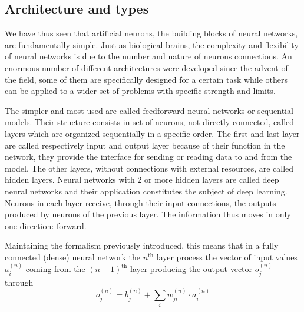 \documentclass[a4paper,10pt]{report}
\begin{document}
\subsection{Architecture and types}

We have thus seen that artificial neurons, the building blocks of neural networks,
are fundamentally simple.
Just as biological brains, the complexity and flexibility
of neural networks is due to the number and nature of neurons connections.
An enormous number of different architectures were developed since the advent of the field,
some of them are specifically designed for a certain task while others can be applied
to a wider set of problems with specific strength and limits.

The simpler and most used are called feedforward neural networks or sequential models.
Their structure consists in set of neurons, not directly connected, called layers which are
organized sequentially in a specific order. 
The first and last layer are called respectively input and output layer because of
their function in the network, they provide the interface for sending or reading data to and from 
the model. The other layers, without connections with external resources, are called hidden layers.
Neural networks with 2 or more hidden layers are called deep neural networks and their
application constitutes the subject of deep learning.
Neurons in each layer receive, through their input connections,
the outputs produced by neurons of the previous layer. The information thus moves in
only one direction: forward.

Maintaining the formalism previously introduced, this means that in a fully connected 
(dense) neural network the $n^{\text{th}}$ layer process the vector of input values 
$a_i^{(n)}$ coming from the $(n-1)^{\text{th}}$ layer producing the output vector $o_j^{(n)}$ through
\begin{equation}
    o_j^{(n)} = b_j^{(n)} + \sum_i w^{(n)}_{ji}\cdot a^{(n)}_i
\end{equation}
\end{document}
